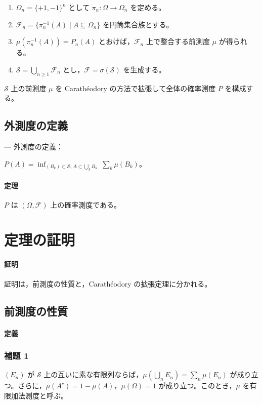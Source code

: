 \documentclass[uplatex,dvipdfmx,11pt,a4paper,openany]{bxjsbook}
\begin{document}
\begin{enumerate}
\item \(\Omega_n = \{+1,-1\}^n\) として \(\pi_n : \Omega \to \Omega_n\) を定める。
\item \(\mathcal{F}_n = \{\pi_n^{-1}(A) \mid A \subseteq \Omega_n\}\) を円筒集合族とする。
\item \(\mu(\pi_n^{-1}(A)) = P_n(A)\) とおけば，\(\mathcal{F}_n\) 上で整合する前測度 \(\mu\) が得られる。
\item \(\mathcal{S} = \bigcup_{n \ge 1} \mathcal{F}_n\) とし，\(\mathcal{F} = \sigma(\mathcal{S})\) を生成する。
\end{enumerate}

\(\mathcal{S}\) 上の前測度 \(\mu\) を Carathéodory の方法で拡張して全体の確率測度 \(P\) を構成する。


\subsection{外測度の定義}
— 外測度の定義：

\(P(A)= \inf_{(B_k)\subset\mathcal{S},\, A\subset \bigcup_k B_k}\ \sum_k \mu(B_k)\)。

\paragraph{定理}
\(P\) は \((\Omega,\mathcal{F})\) 上の確率測度である。


\section{定理の証明}
\paragraph{証明}
証明は，前測度の性質と，Carathéodory の拡張定理に分かれる。

\subsection{前測度の性質}
\paragraph{定義}
\subsubsection{補題 1}
\((E_n)\) が \(\mathcal{S}\) 上の互いに素な有限列ならば，\(\mu\!\left(\bigcup_n E_n\right)=\sum_n \mu(E_n)\) が成り立つ。さらに，\(\mu(A^c)=1-\mu(A)\)，\(\mu(\Omega)=1\) が成り立つ。このとき，\(\mu\) を有限加法測度と呼ぶ。
\end{document}
